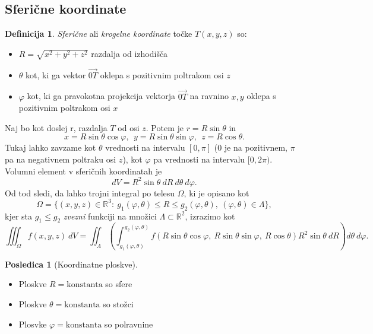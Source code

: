 \documentclass[11pt]{article}
\theoremstyle{definition}
\newtheorem{definicija}{Definicija}[section]
\theoremstyle{definition}
\theoremstyle{definition}
\newtheorem*{posledica}{Posledica}
\begin{document}

\subsection{Sferične koordinate}
\vspace{0.5cm}

\begin{definicija}

\textit{Sferične} ali \textit{krogelne koordinate} točke $T(x, y, z)$ so:
\begin{itemize}
	\item $R = \sqrt{x^2 + y^2 + z^2}$ razdalja od izhodišča
	\item $\theta$ kot, ki ga vektor $\vec{0T}$ oklepa s pozitivnim poltrakom osi $z$
	\item $\varphi$ kot, ki ga pravokotna projekcija vektorja $\vec{0T}$ na ravnino $x,y$ oklepa s pozitivnim poltrakom osi $x$
\end{itemize} 
Naj bo kot doslej r, razdalja $T$ od osi $z$. Potem je $r = R \sin{\theta}$ in
$$x = R \sin{\theta} \cos{\varphi}, ~~y = R \sin{\theta} \sin{\varphi}, ~~z = R \cos{\theta}.$$
Tukaj lahko zavzame kot $\theta$ vrednosti na intervalu $[0, \pi]$ ($0$ je na pozitivnem, $\pi$ pa na negativnem poltraku osi $z$), kot $\varphi$ pa vrednosti na intervalu $[0, 2\pi)$. \\

\noindent Volumni element v sferičnih koordinatah je
$$dV = R^2 \sin{\theta} ~dR ~d\theta ~d\varphi.$$
Od tod sledi, da lahko trojni integral po telesu $\Omega$, ki je opisano kot
$$\Omega = \{ (x, y, z) \in \mathbb{R}^3: ~g_1(\varphi, \theta) \leq R \leq g_2(\varphi, \theta), ~(\varphi, \theta) \in \Lambda \},$$
kjer sta $g_1 \leq g_2$ \textit{zvezni} funkciji na množici $\Lambda \subset \mathbb{R}^2$, izrazimo kot
$$\iiint_{\Omega} f(x, y, z) ~dV = \iint_{\Lambda} \left( \int_{g_1(\varphi, \theta)}^{g_2(\varphi, \theta)} f(R \sin{\theta} \cos{\varphi}, ~R \sin{\theta} \sin{\varphi}, ~R \cos{\theta}) R^2 \sin{\theta} ~dR \right) d\theta ~d\varphi.$$

\end{definicija}
\vspace{0.5cm}

\begin{posledica}[Koordinatne ploskve]
~\\
\begin{itemize}
	\item Ploskve $R = \text{konstanta}$ so sfere
	\item Ploskve $\theta = \text{konstanta}$ so stožci
	\item Plosvke $\varphi = \text{konstanta}$ so polravnine
\end{itemize}

\end{posledica}
\vspace{0.5cm}
\end{document}
